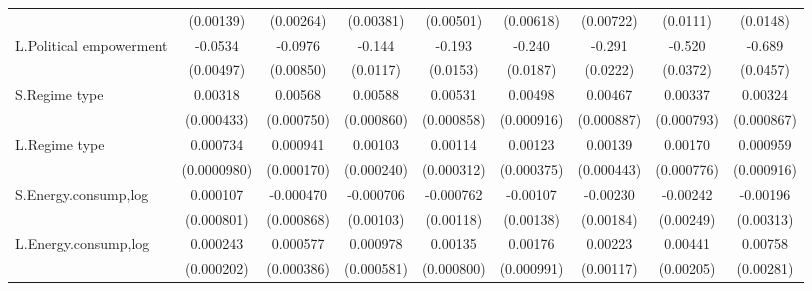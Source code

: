 \begin{table}[htbp]
\begin{tabular}{l*{8}{c}}
                    &   (0.00139)         &   (0.00264)         &   (0.00381)         &   (0.00501)         &   (0.00618)         &   (0.00722)         &    (0.0111)         &    (0.0148)         \\
[1em]
L.Political empowerment&     -0.0534\sym{***}&     -0.0976\sym{***}&      -0.144\sym{***}&      -0.193\sym{***}&      -0.240\sym{***}&      -0.291\sym{***}&      -0.520\sym{***}&      -0.689\sym{***}\\
                    &   (0.00497)         &   (0.00850)         &    (0.0117)         &    (0.0153)         &    (0.0187)         &    (0.0222)         &    (0.0372)         &    (0.0457)         \\
[1em]
S.Regime type       &     0.00318\sym{***}&     0.00568\sym{***}&     0.00588\sym{***}&     0.00531\sym{***}&     0.00498\sym{***}&     0.00467\sym{***}&     0.00337\sym{***}&     0.00324\sym{***}\\
                    &  (0.000433)         &  (0.000750)         &  (0.000860)         &  (0.000858)         &  (0.000916)         &  (0.000887)         &  (0.000793)         &  (0.000867)         \\
[1em]
L.Regime type       &    0.000734\sym{***}&    0.000941\sym{***}&     0.00103\sym{***}&     0.00114\sym{***}&     0.00123\sym{***}&     0.00139\sym{***}&     0.00170\sym{**} &    0.000959         \\
                    & (0.0000980)         &  (0.000170)         &  (0.000240)         &  (0.000312)         &  (0.000375)         &  (0.000443)         &  (0.000776)         &  (0.000916)         \\
[1em]
S.Energy.consump,log&    0.000107         &   -0.000470         &   -0.000706         &   -0.000762         &    -0.00107         &    -0.00230         &    -0.00242         &    -0.00196         \\
                    &  (0.000801)         &  (0.000868)         &   (0.00103)         &   (0.00118)         &   (0.00138)         &   (0.00184)         &   (0.00249)         &   (0.00313)         \\
[1em]
L.Energy.consump,log&    0.000243         &    0.000577         &    0.000978\sym{*}  &     0.00135\sym{*}  &     0.00176\sym{*}  &     0.00223\sym{*}  &     0.00441\sym{**} &     0.00758\sym{***}\\
                    &  (0.000202)         &  (0.000386)         &  (0.000581)         &  (0.000800)         &  (0.000991)         &   (0.00117)         &   (0.00205)         &   (0.00281)         \\

\end{tabular}
\end{table}
